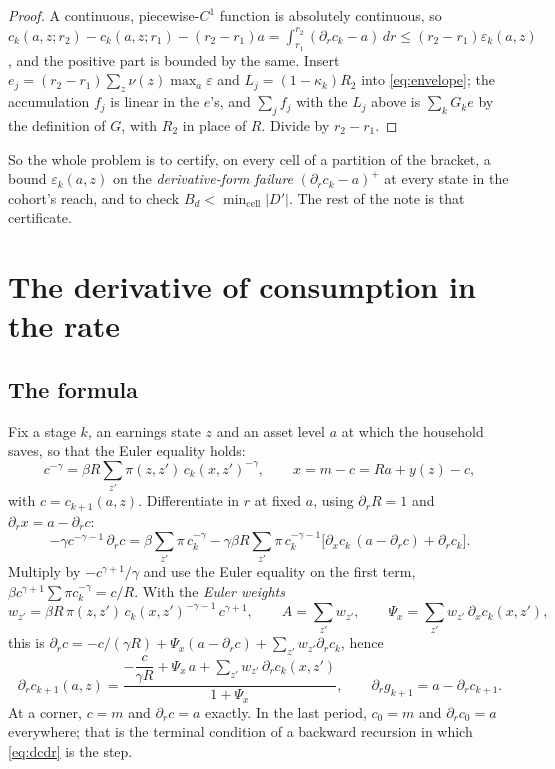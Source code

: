 \documentclass[11pt]{article}
\theoremstyle{definition}
\theoremstyle{remark}
\begin{document}
\begin{proof}
A continuous, piecewise-$C^1$ function is absolutely continuous, so
$c_k(a,z;r_2)-c_k(a,z;r_1)-(r_2-r_1)a=\int_{r_1}^{r_2}(\partial_rc_k-a)\,dr\le(r_2-r_1)\varepsilon_k(a,z)$,
and the positive part is bounded by the same. Insert $e_j=(r_2-r_1)\sum_z\nu(z)\max_a\varepsilon$
and $L_j=(1-\kappa_k)R_2$ into \eqref{eq:envelope}; the accumulation
$f_j$ is linear in the $e$'s, and $\sum_j f_j$ with the $L_j$ above is $\sum_k G_k e$ by the
definition of $G$, with $R_2$ in place of $R$. Divide by $r_2-r_1$.
\end{proof}

So the whole problem is to certify, on every cell of a partition of the bracket, a bound
$\varepsilon_k(a,z)$ on the \emph{derivative-form failure} $(\partial_rc_k-a)^+$ at every state in
the cohort's reach, and to check $B_d<\min_{\text{cell}}|D'|$. The rest of the note is that
certificate.

\section{The derivative of consumption in the rate}\label{sec:deriv}

\subsection{The formula}

Fix a stage $k$, an earnings state $z$ and an asset level $a$ at which the household saves, so that
the Euler equality holds:
\[
  c^{-\gamma}=\beta R\sum_{z'}\pi(z,z')\,c_k(x,z')^{-\gamma},\qquad x=m-c=Ra+y(z)-c,
\]
with $c=c_{k+1}(a,z)$. Differentiate in $r$ at fixed $a$, using $\partial_rR=1$ and
$\partial_rx=a-\partial_rc$:
\[
  -\gamma c^{-\gamma-1}\,\partial_rc
  =\beta\sum_{z'}\pi\,c_k^{-\gamma}
   -\gamma\beta R\sum_{z'}\pi\,c_k^{-\gamma-1}\bigl[\partial_xc_k\,(a-\partial_rc)+\partial_rc_k\bigr].
\]
Multiply by $-c^{\gamma+1}/\gamma$ and use the Euler equality on the first term,
$\beta c^{\gamma+1}\sum\pi c_k^{-\gamma}=c/R$. With the \emph{Euler weights}
\begin{equation}\label{eq:weights}
  w_{z'}=\beta R\,\pi(z,z')\,c_k(x,z')^{-\gamma-1}\,c^{\gamma+1},\qquad
  A=\sum_{z'}w_{z'},\qquad \Psi_x=\sum_{z'}w_{z'}\,\partial_xc_k(x,z'),
\end{equation}
this is $\partial_rc=-c/(\gamma R)+\Psi_x(a-\partial_rc)+\sum_{z'}w_{z'}\partial_rc_k$, hence
\begin{equation}\label{eq:dcdr}
  \partial_rc_{k+1}(a,z)
  =\frac{-\dfrac{c}{\gamma R}+\Psi_x\,a+\sum_{z'}w_{z'}\,\partial_rc_k(x,z')}{1+\Psi_x},
  \qquad
  \partial_rg_{k+1}=a-\partial_rc_{k+1}.
\end{equation}
At a corner, $c=m$ and $\partial_rc=a$ exactly. In the last period, $c_0=m$ and
$\partial_rc_0=a$ everywhere; that is the terminal condition of a backward recursion in which
\eqref{eq:dcdr} is the step.
\end{document}
